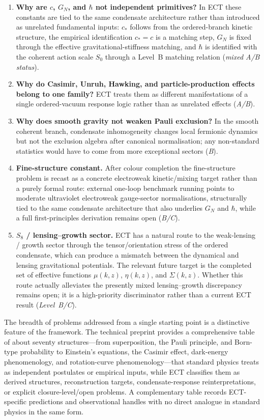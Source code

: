 \documentclass[11pt,a4paper]{article}
\begin{document}
\begin{enumerate}
\item \textbf{Why are $c$, $G_N$, and $\hbar$ not independent primitives?} In ECT these constants are tied to the same condensate architecture rather than introduced as unrelated fundamental inputs: $c_*$ follows from the ordered-branch kinetic structure, the empirical identification $c_*=c$ is a matching step, $G_N$ is fixed through the effective gravitational-stiffness matching, and $\hbar$ is identified with the coherent action scale $S_0$ through a Level~B matching relation (\emph{mixed A/B status}).

\item \textbf{Why do Casimir, Unruh, Hawking, and particle-production effects belong to one family?} ECT treats them as different manifestations of a single ordered-vacuum response logic rather than as unrelated effects (\emph{A/B}).

\item \textbf{Why does smooth gravity not weaken Pauli exclusion?} In the smooth coherent branch, condensate inhomogeneity changes local fermionic dynamics but not the exclusion algebra after canonical normalisation; any non-standard statistics would have to come from more exceptional sectors (\emph{B}).

\item \textbf{Fine-structure constant.} After colour completion the fine-structure problem is recast as a concrete electroweak kinetic/mixing target rather than a purely formal route: external one-loop benchmark running points to moderate ultraviolet electroweak gauge-sector normalisations, structurally tied to the same condensate architecture that also underlies $G_N$ and $\hbar$, while a full first-principles derivation remains open (\emph{B/C}).

\item \textbf{$S_8$ / lensing--growth sector.}
ECT has a natural route to the weak-lensing / growth sector through
the tensor/orientation stress of the ordered condensate, which can
produce a mismatch between the dynamical and lensing gravitational
potentials.  The relevant future target is the completed set of
effective functions $\mu(k,z)$, $\eta(k,z)$, and $\Sigma(k,z)$.
Whether this route actually alleviates the presently mixed
lensing--growth discrepancy remains open; it is a high-priority
discriminator rather than a current ECT result (\emph{Level~B/C}).
\end{enumerate}

The breadth of problems addressed from a single starting point is a distinctive feature of the framework. The technical preprint provides a comprehensive table of about seventy structures---from superposition, the Pauli principle, and Born-type probability to Einstein's equations, the Casimir effect, dark-energy phenomenology, and rotation-curve phenomenology---that standard physics treats as independent postulates or empirical inputs, while ECT classifies them as derived structures, reconstruction targets, condensate-response reinterpretations, or explicit closure-level/open problems. A complementary table records ECT-specific predictions and observational handles with no direct analogue in standard physics in the same form.
\end{document}
